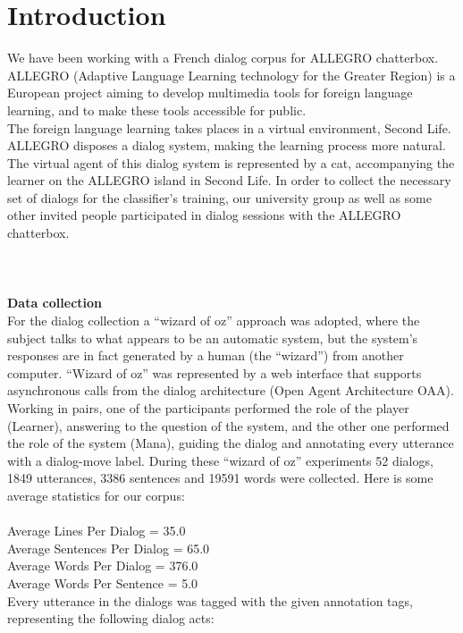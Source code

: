 \documentclass[a4paper]{article}
\begin{document}
\section{Introduction}
We have been working with a French dialog corpus for ALLEGRO chatterbox. ALLEGRO (Adaptive Language Learning technology for the Greater Region) is a European project aiming to develop multimedia tools for foreign language learning, and to make these tools accessible for public.\\
The foreign language learning takes places in a virtual environment, Second Life. ALLEGRO disposes a dialog system, making the learning process more natural. \\
The virtual agent of this dialog system is represented by a cat, accompanying the learner on the ALLEGRO island in Second Life. In order to collect the necessary set of dialogs for the classifier’s training, our university group as well as some other invited people participated in dialog sessions with the ALLEGRO chatterbox. \\
\\
\\
\\
\textbf{Data collection}\\
For the dialog collection a “wizard of oz” approach was adopted, where the subject talks to what appears to be an automatic system, but the system’s responses are in fact generated by a human (the “wizard”) from another computer. “Wizard of oz” was represented by a web interface that supports asynchronous calls from the dialog architecture (Open Agent Architecture OAA).\\
Working in pairs, one of the participants performed the role of the player (Learner), answering to the question of the system, and the other one performed the role of the system (Mana), guiding the dialog and annotating every utterance with a dialog-move label. During these “wizard of oz” experiments 52 dialogs, 1849 utterances, 3386 sentences and 19591 words were collected. Here is some average statistics for our corpus:\\
\\
Average Lines Per Dialog = 35.0\\
Average Sentences Per Dialog = 65.0\\
Average Words Per Dialog = 376.0\\
Average Words Per Sentence = 5.0\\
Every utterance in the dialogs was tagged with the given annotation tags, representing the following dialog acts:\\
\end{document}
